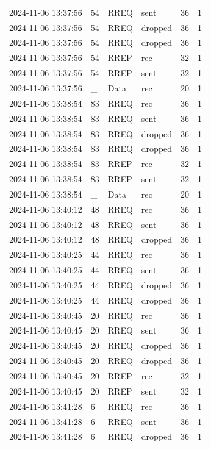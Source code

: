 \documentclass[]{nsm-thesis}
\begin{document}
\begin{longtable}{llllll}
2024-11-06 13:37:56 & 54 & RREQ & sent & 36 & 1 \\
2024-11-06 13:37:56 & 54 & RREQ & dropped & 36 & 1 \\
2024-11-06 13:37:56 & 54 & RREQ & dropped & 36 & 1 \\
2024-11-06 13:37:56 & 54 & RREP & rec & 32 & 1 \\
2024-11-06 13:37:56 & 54 & RREP & sent & 32 & 1 \\
2024-11-06 13:37:56 & _ & Data & rec & 20 & 1 \\
2024-11-06 13:38:54 & 83 & RREQ & rec & 36 & 1 \\
2024-11-06 13:38:54 & 83 & RREQ & sent & 36 & 1 \\
2024-11-06 13:38:54 & 83 & RREQ & dropped & 36 & 1 \\
2024-11-06 13:38:54 & 83 & RREQ & dropped & 36 & 1 \\
2024-11-06 13:38:54 & 83 & RREP & rec & 32 & 1 \\
2024-11-06 13:38:54 & 83 & RREP & sent & 32 & 1 \\
2024-11-06 13:38:54 & _ & Data & rec & 20 & 1 \\
2024-11-06 13:40:12 & 48 & RREQ & rec & 36 & 1 \\
2024-11-06 13:40:12 & 48 & RREQ & sent & 36 & 1 \\
2024-11-06 13:40:12 & 48 & RREQ & dropped & 36 & 1 \\
2024-11-06 13:40:25 & 44 & RREQ & rec & 36 & 1 \\
2024-11-06 13:40:25 & 44 & RREQ & sent & 36 & 1 \\
2024-11-06 13:40:25 & 44 & RREQ & dropped & 36 & 1 \\
2024-11-06 13:40:25 & 44 & RREQ & dropped & 36 & 1 \\
2024-11-06 13:40:45 & 20 & RREQ & rec & 36 & 1 \\
2024-11-06 13:40:45 & 20 & RREQ & sent & 36 & 1 \\
2024-11-06 13:40:45 & 20 & RREQ & dropped & 36 & 1 \\
2024-11-06 13:40:45 & 20 & RREQ & dropped & 36 & 1 \\
2024-11-06 13:40:45 & 20 & RREP & rec & 32 & 1 \\
2024-11-06 13:40:45 & 20 & RREP & sent & 32 & 1 \\
2024-11-06 13:41:28 & 6 & RREQ & rec & 36 & 1 \\
2024-11-06 13:41:28 & 6 & RREQ & sent & 36 & 1 \\
2024-11-06 13:41:28 & 6 & RREQ & dropped & 36 & 1 \\

\end{longtable}
\end{document}
